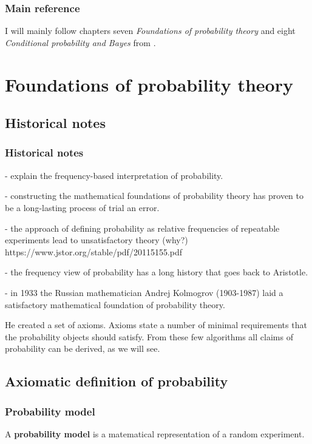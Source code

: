 \begin{frame}
\frametitle{Main reference} %

    I will mainly follow chapters seven \textit{Foundations of probability
    theory} and eight \textit{Conditional probability and Bayes} from
    \citet{tijms12}.

\end{frame}

\section{Foundations of probability theory}

\subsection{Historical notes}

\begin{frame}
\frametitle{Historical notes}

- explain the frequency-based interpretation of probability.

- constructing the mathematical foundations of probability theory has proven to be a long-lasting process of trial an error.  

- the approach of defining probability as relative frequencies of repeatable experiments lead to unsatisfactory theory (why?)
https://www.jstor.org/stable/pdf/20115155.pdf

- the frequency view of probability has a long history that goes back to Aristotle.

- in 1933 the Russian mathematician Andrej Kolmogrov (1903-1987) laid a satisfactory mathematical foundation of probability theory.

He created a set of axioms. Axioms state a number of minimal requirements that the probability objects should satisfy. From these few algorithms all claims of probability can be derived, as we will see.

\end{frame}

\subsection{Axiomatic definition of probability}

\begin{frame}
\frametitle{Probability model}

    \begin{probDef}
        A \textbf{probability model} is a matematical representation of a
        random experiment. 
        \label{def:probabilityModel}
    \end{probDef}

\end{frame}

